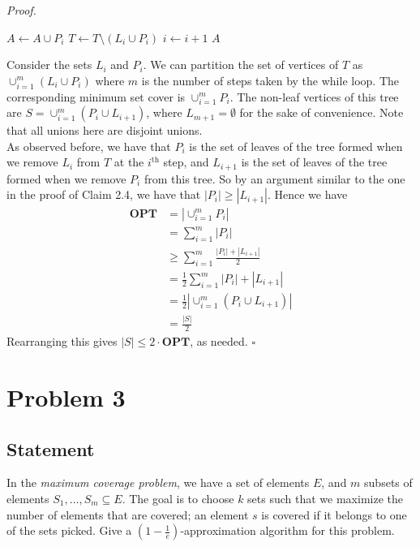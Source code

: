 \documentclass[a4paper]{article}
\newenvironment{proof}{\begin{breakbox}\textit{Proof.}}{\hfill$\square$\end{breakbox}}
\newcommand{\nl}{\vspace{0.2cm}\\}
\newcommand{\OPT}{\mathbf{OPT}}
\begin{document}
\begin{proof}
\begin{algorithmic}[1]
                \State $A \gets A \cup P_i$
                \State $T \gets T \setminus (L_i \cup P_i)$
                \State $i \gets i + 1$
            \EndWhile
            \State \Return $A$
        \EndFunction
    \end{algorithmic}
    Consider the sets $L_i$ and $P_i$. We can partition the set of vertices of $T$ as $\cup_{i=1}^m (L_i \cup P_i)$ where $m$ is the number of steps taken by the while loop.
    The corresponding minimum set cover is $\cup_{i=1}^m P_i$.
    The non-leaf vertices of this tree are $S = \cup_{i=1}^m (P_i \cup L_{i+1})$, where $L_{m+1} = \emptyset$ for the sake of convenience. Note that all unions here are disjoint unions.\nl
    As observed before, we have that $P_i$ is the set of leaves of the tree formed when we remove $L_i$ from $T$ at the $i^\mathrm{th}$ step, and $L_{i+1}$ is the set of leaves of the tree
    formed when we remove $P_i$ from this tree. So by an argument similar to the one in the proof of Claim 2.4, we
    have that $|P_i| \ge |L_{i+1}|$. Hence we have
    \begin{align*}
        \OPT &= |\cup_{i=1}^m P_i|\\
             &= \sum_{i=1}^m |P_i|\\
             &\ge \sum_{i=1}^m \frac{|P_i| + |L_{i+1}|}{2}\\
             &= \frac{1}{2} \sum_{i=1}^m |P_i| + |L_{i+1}|\\
             &= \frac{1}{2} |\cup_{i=1}^m (P_i \cup L_{i+1})|\\
             &= \frac{|S|}{2}
    \end{align*}
    Rearranging this gives $|S| \le 2 \cdot \OPT$, as needed.
\end{proof}

\newpage

\section{Problem 3}
\subsection{Statement}
In the \emph{maximum coverage problem}, we have a set of elements $E$, and $m$ subsets of elements $S_1, \ldots, S_m \subseteq E$. The goal is to choose $k$ sets such that we maximize the number of
elements that are covered; an element $s$ is covered if it belongs to one of the sets picked. Give a $\left(1-\frac{1}{e}\right)$-approximation algorithm for this problem.
\end{document}
